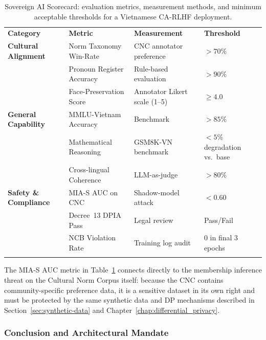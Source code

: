 \begin{table}[ht]
\centering
\caption{Sovereign AI Scorecard: evaluation metrics, measurement
  methods, and minimum acceptable thresholds for a Vietnamese
  CA-RLHF deployment.}
\label{tab:sovereign-scorecard}
\begin{tabular}{p{3.0cm}p{4.2cm}p{2.0cm}p{2.0cm}}
\hline\noalign{\smallskip}
\textbf{Category} &
\textbf{Metric} &
\textbf{Measurement} &
\textbf{Threshold} \\
\noalign{\smallskip}\svhline\noalign{\smallskip}
\textbf{Cultural Alignment}
  & Norm Taxonomy Win-Rate
  & CNC annotator preference
  & $>\!70\%$ \\[3pt]
  & Pronoun Register Accuracy
  & Rule-based evaluation
  & $>\!90\%$ \\[3pt]
  & Face-Preservation Score
  & Annotator Likert scale (1--5)
  & $\geq 4.0$ \\[6pt]
\textbf{General Capability}
  & MMLU-Vietnam Accuracy
  & Benchmark
  & $>\!85\%$ \\[3pt]
  & Mathematical Reasoning
  & GSM8K-VN benchmark
  & $<\!5\%$ degradation vs.\ base \\[3pt]
  & Cross-lingual Coherence
  & LLM-as-judge
  & $>\!80\%$ \\[6pt]
\textbf{Safety \& Compliance}
  & MIA-S AUC on CNC
  & Shadow-model attack
  & $<\!0.60$ \\[3pt]
  & Decree~13 DPIA Pass
  & Legal review
  & Pass/Fail \\[3pt]
  & NCB Violation Rate
  & Training log audit
  & $0$ in final 3 epochs \\
\noalign{\smallskip}\hline\noalign{\smallskip}
\end{tabular}
\end{table}

The MIA-S AUC metric in Table~\ref{tab:sovereign-scorecard}
connects directly to the membership inference threat on the
Cultural Norm Corpus itself: because the CNC contains
community-specific preference data, it is a sensitive dataset
in its own right and must be protected by the same synthetic
data and DP mechanisms described in
Section~\ref{sec:synthetic-data} and
Chapter~\ref{chap:differential_privacy}.

\subsubsection{Conclusion and Architectural Mandate}
\label{subsubsec:sovereign-conclusion}

